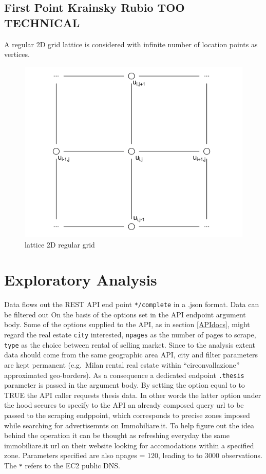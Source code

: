 \documentclass[
  12pt,
  a4paper,
  oneside]{book}
\theoremstyle{definition}
\theoremstyle{definition}
\theoremstyle{definition}
\theoremstyle{remark}
\begin{document}
\hypertarget{first-point-krainsky-rubio-too-technical}{%
\section{First Point Krainsky Rubio TOO TECHNICAL}\label{first-point-krainsky-rubio-too-technical}}

A regular 2D grid lattice is considered with infinite number of location points as vertices.

\begin{figure}
\centering
\includegraphics{images/lattice.png}
\caption{lattice 2D regular grid}
\end{figure}

\hypertarget{exploratory}{%
\chapter{Exploratory Analysis}\label{exploratory}}

Data flows out the REST API end point \texttt{*/complete} in a .json format. Data can be filtered out On the basis of the options set in the API endpoint argument body. Some of the options supplied to the API, as in section \ref{APIdocs}, might regard the real estate \texttt{city} interested, \texttt{npages} as the number of pages to scrape, \texttt{type} as the choice between rental of selling market. Since to the analysis extent data should come from the same geographic area API, city and filter parameters are kept permanent (e.g.~Milan rental real estate within ``circonvallazione'' approximated geo-borders). As a consequence a dedicated endpoint \texttt{.thesis} parameter is passed in the argument body. By setting the option equal to to TRUE the API caller requests thesis data. In other words the latter option under the hood secures to specify to the API an already composed query url to be passed to the scraping endppoint, which corresponds to precise zones imposed while searching for advertisemnts on Immobiliare.it. To help figure out the idea behind the operation it can be thought as refreshing everyday the same immobiliare.it url on their website looking for accomodations within a specified zone.
Parameters specified are also npages = 120, leading to to 3000 observations. The \texttt{*} refers to the EC2 public DNS.
\end{document}
